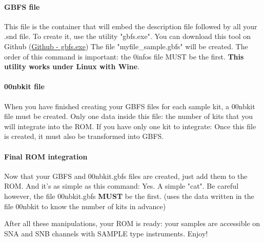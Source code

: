 \paragraph{GBFS file} This file is the container that will embed the description file followed by all your .snd file.
To create it, use the utility "gbfs.exe".
You can download this tool on \FAT Github (\href{https://github.com/cbrouillard/furiousadvancetracker/blob/master/gbfs.exe?raw=true}{Github - gbfs.exe})
The file "myfile\_sample.gbfs" will be created.
The order of this command is important: the 0infos file MUST be the first.
{\bf This utility works under Linux with Wine}.

\paragraph{00nbkit file} When you have finished creating your GBFS files for each sample kit, a 00nbkit file must be created.
Only one data inside this file: the number of kits that you will integrate into the ROM.
If you have only one kit to integrate:
Once this file is created, it must also be transformed into GBFS.

\paragraph{Final ROM integration} Now that your GBFS and 00nbkit.gbfs files are created, just add them to the ROM.
And it's as simple as this command:
Yes. A simple "cat".
Be careful however, the file 00nbkit.gbfs {\bf MUST} be the first.
(\FAT uses the data written in the file 00nbkit to know the number of kits in advance)
\medskip

After all these manipulations, your ROM is ready: your samples are accessible on SNA and SNB channels with SAMPLE type instruments. Enjoy!
